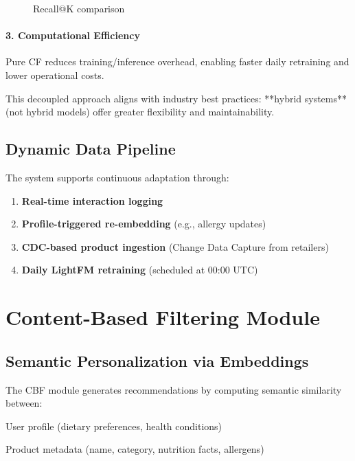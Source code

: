 \begin{figure}[H]
\begin{minipage}{0.48\textwidth}
        \caption{Recall@K comparison}
        \label{fig:recall}
    \end{minipage}
\end{figure}

\paragraph{3. Computational Efficiency}
Pure CF reduces training/inference overhead, enabling faster daily retraining and lower operational costs.

This decoupled approach aligns with industry best practices: **hybrid systems** (not hybrid models) offer greater flexibility and maintainability.

\subsection{Dynamic Data Pipeline}
The system supports continuous adaptation through:
\begin{enumerate}
    \item \textbf{Real-time interaction logging}
    \item \textbf{Profile-triggered re-embedding} (e.g., allergy updates)
    \item \textbf{CDC-based product ingestion} (Change Data Capture from retailers)
    \item \textbf{Daily LightFM retraining} (scheduled at 00:00 UTC)
\end{enumerate}

\section{Content-Based Filtering Module}
\subsection{Semantic Personalization via Embeddings}
The CBF module generates recommendations by computing semantic similarity between:
\item User profile (dietary preferences, health conditions)
    \item Product metadata (name, category, nutrition facts, allergens)

